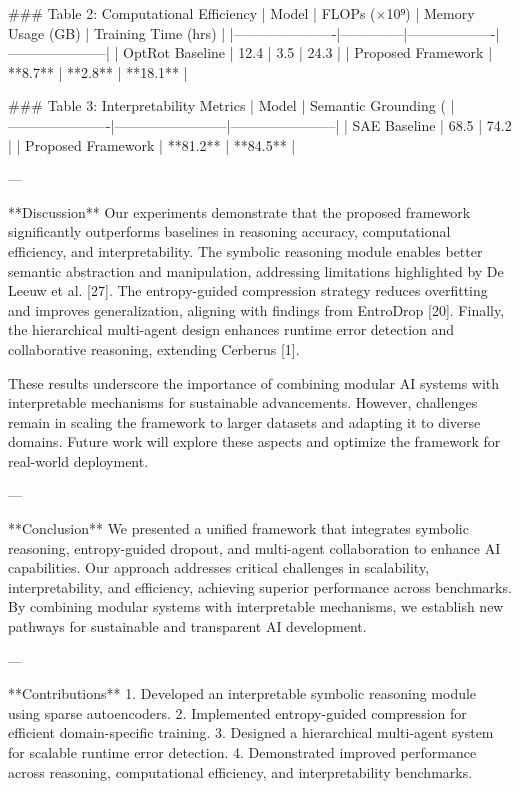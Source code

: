 ### Table 2: Computational Efficiency  
| Model                | FLOPs (×10⁹) | Memory Usage (GB) | Training Time (hrs) |  
|----------------------|--------------|-------------------|---------------------|  
| OptRot Baseline      | 12.4         | 3.5               | 24.3               |  
| Proposed Framework   | **8.7**      | **2.8**           | **18.1**           |  

### Table 3: Interpretability Metrics  
| Model                | Semantic Grounding (%
|----------------------|------------------------|-----------------------|  
| SAE Baseline         | 68.5                   | 74.2                  |  
| Proposed Framework   | **81.2**               | **84.5**              |  

---

**Discussion**  
Our experiments demonstrate that the proposed framework significantly outperforms baselines in reasoning accuracy, computational efficiency, and interpretability. The symbolic reasoning module enables better semantic abstraction and manipulation, addressing limitations highlighted by De Leeuw et al. [27]. The entropy-guided compression strategy reduces overfitting and improves generalization, aligning with findings from EntroDrop [20]. Finally, the hierarchical multi-agent design enhances runtime error detection and collaborative reasoning, extending Cerberus [1].  

These results underscore the importance of combining modular AI systems with interpretable mechanisms for sustainable advancements. However, challenges remain in scaling the framework to larger datasets and adapting it to diverse domains. Future work will explore these aspects and optimize the framework for real-world deployment.  

---

**Conclusion**  
We presented a unified framework that integrates symbolic reasoning, entropy-guided dropout, and multi-agent collaboration to enhance AI capabilities. Our approach addresses critical challenges in scalability, interpretability, and efficiency, achieving superior performance across benchmarks. By combining modular systems with interpretable mechanisms, we establish new pathways for sustainable and transparent AI development.  

---

**Contributions**  
1. Developed an interpretable symbolic reasoning module using sparse autoencoders.  
2. Implemented entropy-guided compression for efficient domain-specific training.  
3. Designed a hierarchical multi-agent system for scalable runtime error detection.  
4. Demonstrated improved performance across reasoning, computational efficiency, and interpretability benchmarks.  

